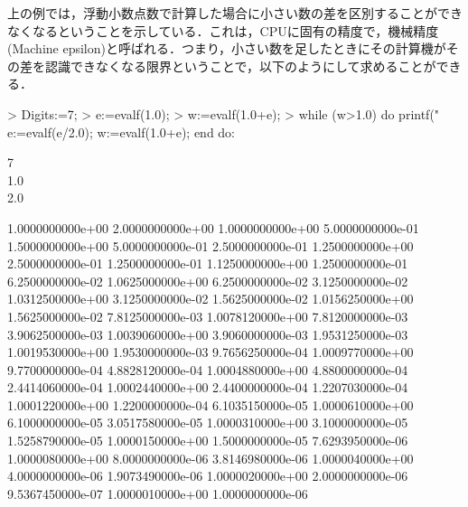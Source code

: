 上の例では，浮動小数点数で計算した場合に小さい数の差を区別することができなくなるということを示している．これは，CPUに固有の精度で，機械精度(Machine epsilon)と呼ばれる．つまり，小さい数を足したときにその計算機がその差を認識できなくなる限界ということで，以下のようにして求めることができる．
\begin{MapleInput}
> Digits:=7; 
> e:=evalf(1.0);
> w:=evalf(1.0+e); 
> while (w>1.0) do 
    printf("%
    e:=evalf(e/2.0); 
    w:=evalf(1.0+e); 
  end do:
\end{MapleInput}
\begin{MapleOutputGather}
7 \notag \\
1.0 \notag \\
2.0 \notag
\end{MapleOutputGather}
\begin{MapleError}
1.0000000000e+00 2.0000000000e+00 1.0000000000e+00
5.0000000000e-01 1.5000000000e+00 5.0000000000e-01
2.5000000000e-01 1.2500000000e+00 2.5000000000e-01
1.2500000000e-01 1.1250000000e+00 1.2500000000e-01
6.2500000000e-02 1.0625000000e+00 6.2500000000e-02
3.1250000000e-02 1.0312500000e+00 3.1250000000e-02
1.5625000000e-02 1.0156250000e+00 1.5625000000e-02
7.8125000000e-03 1.0078120000e+00 7.8120000000e-03
3.9062500000e-03 1.0039060000e+00 3.9060000000e-03
1.9531250000e-03 1.0019530000e+00 1.9530000000e-03
9.7656250000e-04 1.0009770000e+00 9.7700000000e-04
4.8828120000e-04 1.0004880000e+00 4.8800000000e-04
2.4414060000e-04 1.0002440000e+00 2.4400000000e-04
1.2207030000e-04 1.0001220000e+00 1.2200000000e-04
6.1035150000e-05 1.0000610000e+00 6.1000000000e-05
3.0517580000e-05 1.0000310000e+00 3.1000000000e-05
1.5258790000e-05 1.0000150000e+00 1.5000000000e-05
7.6293950000e-06 1.0000080000e+00 8.0000000000e-06
3.8146980000e-06 1.0000040000e+00 4.0000000000e-06
1.9073490000e-06 1.0000020000e+00 2.0000000000e-06
9.5367450000e-07 1.0000010000e+00 1.0000000000e-06
\end{MapleError}